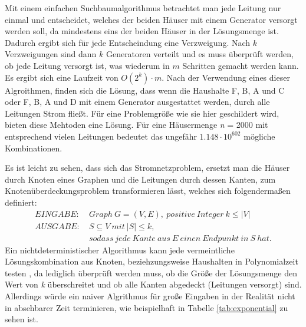 Mit einem einfachen Suchbaumalgorithmus betrachtet man jede Leitung nur einmal und entscheidet, welches der beiden Häuser mit einem Generator versorgt werden soll, da mindestens eins der beiden Häuser in der Lösungsmenge ist. Dadurch ergibt sich für jede Entscheindung eine Verzweigung. Nach $k$ Verzweigungen sind dann $k$ Generatoren verteilt und es muss überprüft werden, ob jede Leitung versorgt ist, was wiederum in $m$ Schritten gemacht werden kann. Es ergibt sich eine Laufzeit von $O(2^{k}) \cdot m$.
Nach der Verwendung eines dieser Algroithmen, finden sich die Lösung, dass wenn die Haushalte F, B, A und C oder F, B, A und D mit einem Generator ausgestattet werden, durch alle Leitungen Strom fließt. Für eine Problemgröße wie sie hier geschildert wird, bieten diese Mehtoden eine Lösung. Für eine Häusermenge \emph{n} = 2000 mit entsprechend vielen Leitungen bedeutet das ungefähr $1.148 \cdot 10^{602}$ mögliche Kombinationen.

Es ist leicht zu sehen, dass sich das Stromnetzproblem, ersetzt man die Häuser durch Knoten eines Graphen und die Leitungen durch dessen Kanten,  zum Knotenüberdeckungsproblem transformieren lässt, welches sich folgendermaßen definiert\cite{trees}:
\begin{align*}
EINGABE: &\ Graph\ G=(V,E),\ positive\ Integer\ k\leq |V|\\
AUSGABE: &\ S\subseteq V\ mit\ |S|\leq k,\\
&\ sodass\ jede\ Kante\ aus\ E\ einen\ Endpunkt\ in\ S\ hat.
\end{align*}
Ein nichtdeterministischer Algorithmus kann jede vermeintliche Lösungskombination aus Knoten, beziehzungsweise Haushalten in Polynomialzeit testen \cite{intract}, da lediglich überprüft werden muss, ob die Größe der Lösungsmenge den Wert von \emph{k} überschreitet und ob alle Kanten abgedeckt (Leitungen versorgt) sind.
 Allerdings würde ein naiver Algrithmus für große Eingaben in der Realität nicht in absehbarer Zeit terminieren, wie beispielhaft in Tabelle \ref{tab:exponential} zu sehen ist.
 
